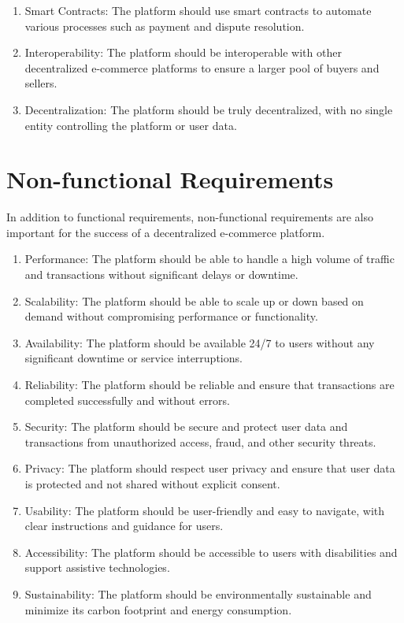 \documentclass[a4paper,11pt]{article}
\begin{document}
\begin{center}
\begin{enumerate}
\item Smart Contracts: The platform should use smart contracts to automate various processes such as payment and dispute resolution.
\item Interoperability: The platform should be interoperable with other decentralized e-commerce platforms to ensure a larger pool of buyers and sellers.
\item Decentralization: The platform should be truly decentralized, with no single entity controlling the platform or user data.
\end{enumerate}


\section{Non-functional Requirements}

In addition to functional requirements, non-functional requirements are also important for the success of a decentralized e-commerce platform.

\begin{enumerate}
    \item Performance: The platform should be able to handle a high volume of traffic and transactions without significant delays or downtime.
    \item Scalability: The platform should be able to scale up or down based on demand without compromising performance or functionality.
    \item Availability: The platform should be available 24/7 to users without any significant downtime or service interruptions.
    \item Reliability: The platform should be reliable and ensure that transactions are completed successfully and without errors.

    \item Security: The platform should be secure and protect user data and transactions from unauthorized access, fraud, and other security threats.
    \item Privacy: The platform should respect user privacy and ensure that user data is protected and not shared without explicit consent.
    \item Usability: The platform should be user-friendly and easy to navigate, with clear instructions and guidance for users.
    \item Accessibility: The platform should be accessible to users with disabilities and support assistive technologies.
    \item Sustainability: The platform should be environmentally sustainable and minimize its carbon footprint and energy consumption.
\end{enumerate}


\end{center}
\end{document}

